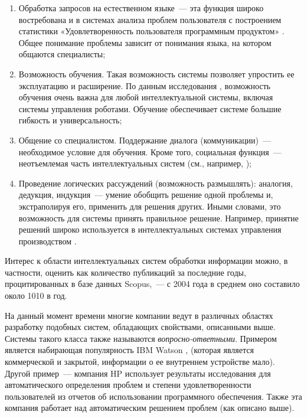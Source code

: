 \begin{enumerate}
  \item Обработка запросов на естественном языке~--- эта функция широко востребована и в системах анализа проблем пользователя с построением статистики «Удовлетворенность пользователя программным продуктом» \cite{TUTUB-1}. Общее понимание проблемы зависит от понимания языка, на котором общаются специалисты;
  \item Возможность обучения. Такая возможность системы позволяет упростить ее эксплуатацию и расширение. По данным исследования \cite{LEARN-1}, возможность обучения очень важна для любой интеллектуальной системы, включая системы управления роботами. Обучение обеспечивает системе большие гибкость и универсальность;
  \item Общение со специалистом. Поддержание диалога (коммуникации)~--- необходимое условие для обучения. Кроме того, социальная функция~--- неотъемлемая часть интеллектуальных систем (см., например, \cite{LEARN-2});
  \item Проведение логических рассуждений (возможность размышлять): аналогия, дедукция, индукция~--- умение обобщить решение одной проблемы и, экстраполируя его, применить для решения других. Иными словами, это возможность для системы принять правильное решение. Например, принятие решений широко используется в интеллектуальных системах управления производством  \cite{LEARN-3}.
\end{enumerate} \par

Интерес к области интеллектуальных систем обработки информации можно, в частности, оценить как количество публикаций за последние годы, процитированных в базе данных Scopus,~--- с 2004 года в среднем оно составило около 1010 в год. \par


На данный момент времени многие компании ведут в различных областях разработку подобных систем, обладающих свойствами, описанными выше. Системы такого класса также называются \textit{вопросно-ответными}. Примером является набирающая популярность IBM Watson \cite{WATSON-PO}, \cite{WATSON-PTOP} (которая является коммерческой и закрытой, информации о ее внутреннем устройстве мало). Другой пример~--- компания HP использует результаты исследования \cite{TUTUB-2} для автоматического определения проблем и степени удовлетворенности пользователей из отчетов об использовании программного обеспечения. Также эта компания работает над автоматическим решением проблем (как описано выше). \par

